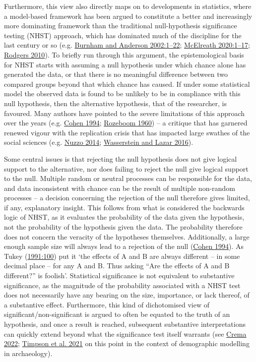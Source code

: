 \documentclass[
  12pt,
  a4paper,
  oneside]{book}
\begin{document}
Furthermore, this view also directly maps on to developments in statistics, where a model-based framework has been argued to constitute a better and increasingly more dominating framework than the traditional null-hypothesis significance testing (NHST) approach, which has dominated much of the discipline for the last century or so (e.g. \protect\hyperlink{ref-burnham2002}{Burnham and Anderson 2002:1--22}; \protect\hyperlink{ref-mcelreath2020}{McElreath 2020:1--17}; \protect\hyperlink{ref-rodgers2010}{Rodgers 2010}). To briefly run through this argument, the epistemological basis for NHST starts with assuming a null hypothesis under which chance alone has generated the data, or that there is no meaningful difference between two compared groups beyond that which chance has caused. If under some statistical model the observed data is found to be unlikely to be in compliance with this null hypothesis, then the alternative hypothesis, that of the researcher, is favoured. Many authors have pointed to the severe limitations of this approach over the years (e.g. \protect\hyperlink{ref-cohen1994}{Cohen 1994}; \protect\hyperlink{ref-rozeboom1960}{Rozeboom 1960}) -- a critique that has garnered renewed vigour with the replication crisis that has impacted large swathes of the social sciences (e.g. \protect\hyperlink{ref-nuzzo2014}{Nuzzo 2014}; \protect\hyperlink{ref-wasserstein2016}{Wasserstein and Lazar 2016}).

Some central issues is that rejecting the null hypothesis does not give logical support to the alternative, nor does failing to reject the null give logical support to the null. Multiple random or neutral processes can be responsible for the data, and data inconsistent with chance can be the result of multiple non-random processes -- a decision concerning the rejection of the null therefore gives limited, if any, explanatory insight. This follows from what is considered the backwards logic of NHST, as it evaluates the probability of the data given the hypothesis, not the probability of the hypothesis given the data. The probability therefore does not concern the veracity of the hypotheses themselves. Additionally, a large enough sample size will always lead to a rejection of the null (\protect\hyperlink{ref-cohen1994}{Cohen 1994}). As Tukey (\protect\hyperlink{ref-tukey1991}{1991:100}) put it `the effects of A and B are always different -- in some decimal place -- for any A and B. Thus asking ``Are the effects of A and B different?'' is foolish'. Statistical significance is not equivalent to substantive significance, as the magnitude of the probability associated with a NHST test does not necessarily have any bearing on the size, importance, or lack thereof, of a substantive effect. Furthermore, this kind of dichotomised view of significant/non-significant is argued to often be equated to the truth of an hypothesis, and once a result is reached, subsequent substantive interpretations can quickly extend beyond what the significance test itself warrants (see \protect\hyperlink{ref-crema2022}{Crema 2022}; \protect\hyperlink{ref-timpson2021}{Timpson et al. 2021} on this point in the context of demographic modelling in archaeology).
\end{document}
